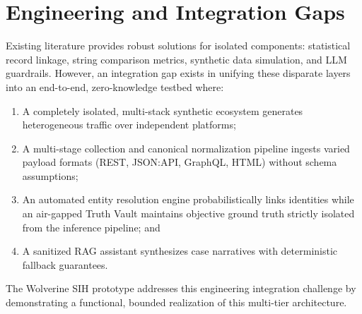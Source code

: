 \section{Engineering and Integration Gaps}
\label{sec:related-gaps}
Existing literature provides robust solutions for isolated components: statistical record linkage, string comparison metrics, synthetic data simulation, and LLM guardrails. However, an integration gap exists in unifying these disparate layers into an end-to-end, zero-knowledge testbed where:
\begin{enumerate}
    \item A completely isolated, multi-stack synthetic ecosystem generates heterogeneous traffic over independent platforms;
    \item A multi-stage collection and canonical normalization pipeline ingests varied payload formats (REST, JSON:API, GraphQL, HTML) without schema assumptions;
    \item An automated entity resolution engine probabilistically links identities while an air-gapped Truth Vault maintains objective ground truth strictly isolated from the inference pipeline; and
    \item A sanitized RAG assistant synthesizes case narratives with deterministic fallback guarantees.
\end{enumerate}
The Wolverine SIH prototype addresses this engineering integration challenge by demonstrating a functional, bounded realization of this multi-tier architecture.

